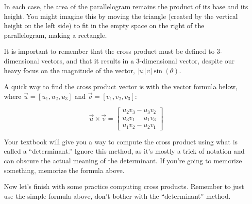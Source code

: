 \documentclass{ximera}
\begin{document}
\begin{center}
\end{center}

In each case, the area of the parallelogram remains the product of its base and its height. You might imagine this by moving the triangle (created by the vertical height on the left side) to fit in the empty space on the right of the parallelogram, making a rectangle.

It is important to remember that the cross product must be defined to 3-dimensional vectors, and that it results in a 3-dimensional vector, despite our heavy focus on the magnitude of the vector, $|u||v|\sin(\theta)$.

\begin{definition}
    A quick way to find the cross product vector is with the vector formula below, where $\vec{u}=[u_1,u_2,u_3]$ and $\vec{v}=[v_1,v_2,v_3]$: 

    \[\vec{u}\times \vec{v} = 
    \begin{bmatrix}
    u_2 v_3 - u_3 v_2 \\
    u_3 v_1 - u_1 v_3 \\
    u_1 v_2 - u_2 v_1
    \end{bmatrix}\]
\end{definition}

\begin{remark}
Your textbook will give you a way to compute the cross product using what is called a ``determinant.'' Ignore this method, as it's mostly a trick of notation and can obscure the actual meaning of the determinant. If you're going to memorize something, memorize the formula above.
\end{remark}

Now let's finish with some practice computing cross products. Remember to just use the simple formula above, don't bother with the ``determinant'' method.
\end{document}
